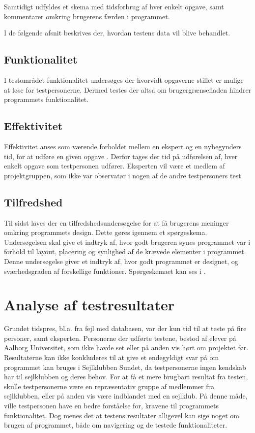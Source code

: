 Samtidigt udfyldes et skema med tidsforbrug af hver enkelt opgave, samt kommentarer omkring brugerens færden i programmet.

I de følgende afsnit beskrives der, hvordan testens data vil blive behandlet.

\subsection{Funktionalitet}
I testområdet funktionalitet undersøges der hvorvidt opgaverne stillet er mulige at løse for testpersonerne.
Dermed testes der altså om brugergrænsefladen hindrer programmets funktionalitet. 

\subsection{Effektivitet}
Effektivitet anses som værende forholdet mellem en ekspert og en nybegynders tid, for at udføre en given opgave \citep{UIEffeciency}.
Derfor tages der tid på udførelsen af, hver enkelt opgave som testpersonen udfører.
Eksperten vil være et medlem af projektgruppen, som ikke var observatør i nogen af de andre testpersoners test. 

\subsection{Tilfredshed}
Til sidst laves der en tilfredshedsundersøgelse for at få brugerens meninger omkring programmets design. 
Dette gøres igennem et spørgeskema. 
Undersøgelsen skal give et indtryk af, hvor godt brugeren synes programmet var i forhold til layout, placering og synlighed af de krævede elementer i programmet. 
Denne undersøgelse giver et indtryk af, hvor godt programmet er designet, og sværhedsgraden af forskellige funktioner. 
Spørgeskemaet kan ses i . \citep{UISatisfaction}


\section{Analyse af testresultater}

Grundet tidspres, bl.a. fra fejl med databasen, var der kun tid til at teste på fire personer, samt eksperten.
Personerne der udførte testene, bestod af elever på Aalborg Universitet, som ikke havde set eller på anden vis hørt om projektet før.
Resultaterne kan ikke konkluderes til at give et endegyldigt svar på om programmet kan bruges i Sejlklubben Sundet, da testpersonerne ingen kendskab har til sejlklubben og deres behov.
For at få et mere brugbart resultat fra testen, skulle testpersonerne være en repræsentativ gruppe af medlemmer fra sejlklubben, eller på anden vis være indblandet med en sejlklub. 
På denne måde, ville testpersonen have en bedre forståelse for, kravene til programmets funktionalitet.
Dog menes det at testens resultater alligevel kan sige noget om brugen af programmet, både om navigering og de testede funktionaliteter.
